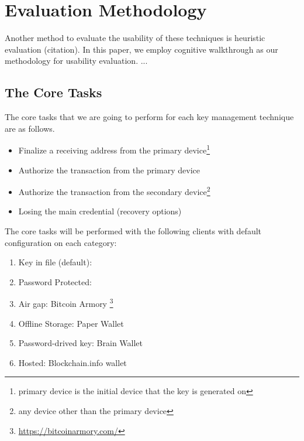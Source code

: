 
\section{Evaluation Methodology}

Another method to evaluate the usability of these techniques is heuristic evaluation (citation). In this paper, we employ cognitive walkthrough as our methodology for usability evaluation.
... 


\subsection {The Core Tasks}
The core tasks that we are going to perform for each key management technique are as follows.

\begin{itemize}
\renewcommand{\labelitemi}{\bf CT-1} \label{sec:ct-1}
\item Finalize a receiving address from the primary device\footnote{primary device is the initial device that the key is generated on} 
\renewcommand{\labelitemi}{\bf CT-2} \label{sec:ct-2}
\item Authorize the transaction from the primary device 
\renewcommand{\labelitemi}{\bf CT-3} \label{sec:ct-3}
\item Authorize the transaction from the secondary device\footnote{any device other than the primary device}
\renewcommand{\labelitemi}{\bf CT-4} \label{sec:ct-4}
\item Losing the main credential (recovery options)
\end{itemize}

The core tasks will be performed with the following clients with default configuration on each category:

\begin{enumerate}
\item Key in file (default):  \bitcoinclient 
\item Password Protected: \multibit 
\item Air gap: Bitcoin Armory \footnote{\url{https://bitcoinarmory.com/}}
\item Offline Storage: Paper Wallet
\item Password-drived key: Brain Wallet
\item Hosted: Blockchain.info wallet

\end{enumerate}

